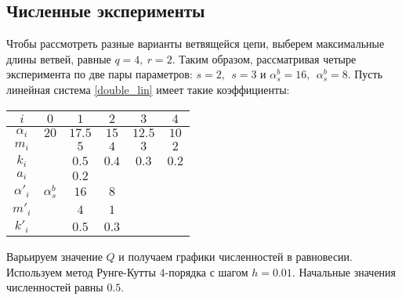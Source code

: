 \subsection{Численные эксперименты}
Чтобы рассмотреть разные варианты ветвящейся цепи, выберем максимальные длины ветвей, равные \(q = 4, ~ r=2\). Таким образом, рассматривая четыре эксперимента по две пары параметров: \(s=2, ~~ s=3\) и \(\alpha^b_s = 16, ~~ \alpha^b_s = 8\). Пусть линейная система \eqref{double_lin} имеет такие коэффициенты:

\begin{center}
    \begin{tabular}{|c|c|c|c|c|c|}
        \hline
        \(i\)        & \(0\) & \(1\) & \(2\) & \(3\) & \(4\) \\ \hline
        \(\alpha_i\)& \(20\) & \(17.5\) & \(15\) & \(12.5\) & \(10\) \\ \hline
        \(m_i\) &            & \(5\) & \(4\) & \(3\) & \(2\) \\ \hline
        \(k_i\) &            & \(0.5\) & \(0.4\) & \(0.3\) & \(0.2\) \\ \hline
        \(a_i\) &            & \(0.2\) &  &  &  \\ \hline \hline

        \(\alpha'_i\)& \(\alpha^b_s\) & \(16\) & \(8\) &  &  \\ \hline
        \(m'_i\) &            & \(4\) & \(1\) &  &  \\ \hline
        \(k'_i\) &            & \(0.5\) & \(0.3\) &  &  \\ \hline
    \end{tabular}
\end{center}

Варьируем значение \(Q\) и получаем графики численностей в равновесии. Используем метод Рунге-Кутты \(4\)-порядка с шагом \(h = 0.01\). Начальные значения численностей равны \(0.5\). 

